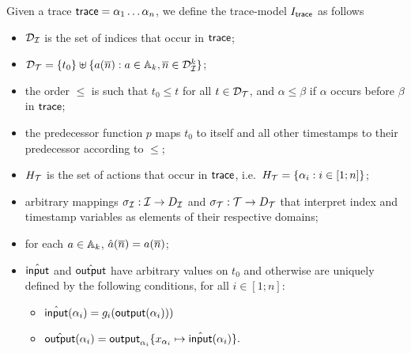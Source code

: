 \begin{definition}
  Given a trace $\textsf{trace} = \alpha_1\ldots\alpha_n$,
  we define the trace-model $I_{\textsf{trace}}$ as follows
  \begin{itemize}
    \item $\mathcal{D}_{\mathcal{I}}$ is the set of indices that occur in $\textsf{trace}$;
    \item $\mathcal{D}_{\mathcal{T}} = \{ t_0 \} \uplus \{ a(\overline{n}) : a\in\mathbb{A}_k,
      \overline{n}\in\mathcal{D}_{\mathcal{I}}^k \}$;
    \item the order $\leq$ is such that $t_0\leq t$ for all $t\in\mathcal{D}_{\mathcal{T}}$,
      and $\alpha\leq\beta$ if $\alpha$ occurs before $\beta$ in $\textsf{trace}$;
    \item the predecessor function $p$ maps $t_0$ to itself and all
      other timestamps to their predecessor according to $\leq$;
    \item $H_{\mathcal{T}}$ is the set of actions that occur in $\textsf{trace}$,
      i.e.\ $H_{\mathcal{T}}=\{\alpha_i : i\in[1;n]\}$;
    \item arbitrary mappings $\sigma_{\mathcal{I}} : \mathcal{I} \to D_{\mathcal{I}}$
      and $\sigma_{\mathcal{T}} : \mathcal{T} \to D_{\mathcal{T}}$ that interpret index and
      timestamp variables as elements of their respective domains;
    \item for each $a\in\mathbb{A}_k$, $\hat{a}(\overline{n}) = a(\overline{n})$;
    \item $\hat{\textsf{input}}$ and $\hat{\textsf{output}}$ have arbitrary values on
      $t_0$ and otherwise are uniquely defined by the following
      conditions, for all $i\in[1;n]$:
      \begin{itemize}
        \item $\hat{\textsf{input}}(\alpha_i) = g_{i}(\textsf{output}(\alpha_i)))$
        \item $\hat{\textsf{output}}(\alpha_i) =
      \textsf{output}_{\alpha_i}\{x_{\alpha_i}\mapsto\hat{\textsf{input}}(\alpha_i)\}.$
      \end{itemize}
  \end{itemize}
\end{definition}

